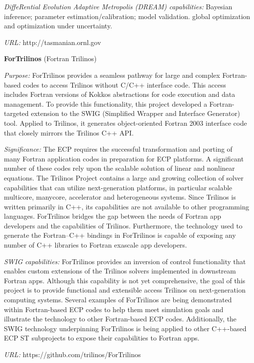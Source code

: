{\it DiffeRential Evolution Adaptive Metropolis (DREAM) capabilities:}
Bayesian inference; parameter estimation/calibration; model validation.
global optimization and optimization under uncertainty.

{\it URL:} http://tasmanian.ornl.gov


{\bf ForTrilinos} (Fortran Trilinos)

{\it Purpose:}
ForTrilinos provides a seamless pathway for large and complex Fortran-based
codes to access Trilinos without C/C++ interface code. This access includes
Fortran versions of Kokkos abstractions for code execution and data management.
To provide this functionality, this project developed a Fortran-targeted
extension to the SWIG (Simplified Wrapper and Interface Generator) tool.
Applied to Trilinos, it generates object-oriented Fortran 2003 interface code
that closely mirrors the Trilinos C++ API.

{\it Significance:}
The ECP requires the successful transformation and
porting of many Fortran application codes in preparation for ECP platforms. A
significant number of these codes rely upon the scalable solution of linear and
nonlinear equations. The Trilinos Project contains a large and growing
collection of solver capabilities that can utilize next-generation platforms, in
particular scalable multicore, manycore, accelerator and heterogeneous systems.
Since Trilinos is written primarily in C++, its capabilities are not available
to other programming languages. ForTrilinos bridges the gap between the
needs of Fortran app developers and the capabilities of Trilinos. Furthermore,
the technology used to generate the Fortran--C++ bindings in ForTrilinos is
capable of exposing any number of C++ libraries to Fortran exascale app
developers.


{\it SWIG capabilities:}
ForTrilinos provides an inversion of control functionality that enables custom
extensions of the Trilinos solvers implemented in downstream Fortran apps.
Although this capability is not yet comprehensive, the goal of this project is
to provide functional and extensible access Trilinos on next-generation
computing systems. Several examples of ForTrilinos are being demonstrated within
Fortran-based ECP codes to help them meet simulation goals and illustrate the
technology to other Fortran-based ECP codes. Additionally, the SWIG technology
underpinning ForTrilinos is being applied to other C++-based ECP ST subprojects
to expose their capabilities to Fortran apps.

{\it URL:} https://github.com/trilinos/ForTrilinos

